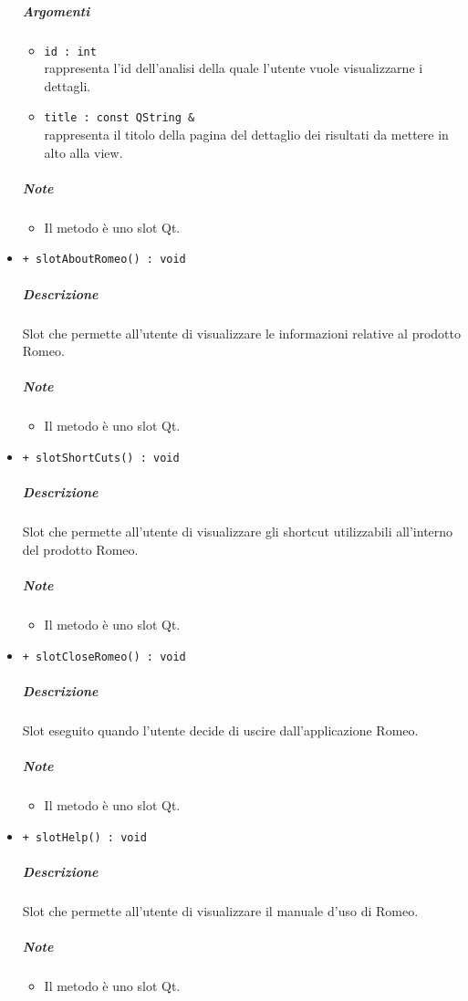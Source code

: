 \begin{itemize}
			\color{black}
			\subparagraph{Argomenti}
			\begin{itemize}
				\item \color{RoyalPurple} \verb!id : int!\\				
\color{black} rappresenta l'id dell'analisi della quale l'utente vuole visualizzarne i dettagli.
				\item \color{RoyalPurple} \verb!title : const QString &!\\				
\color{black} rappresenta il titolo della pagina del dettaglio dei risultati da mettere in alto alla view.
			\end{itemize}
			\subparagraph{Note}
			\begin{itemize}
				\item Il metodo è uno slot\g{} Qt\g{}.
			\end{itemize}
			\item \color{blue} \verb!+ slotAboutRomeo() : void!
			\color{black}
			\subparagraph{Descrizione} Slot\g{} che permette all'utente di visualizzare le informazioni relative al prodotto Romeo.
			\subparagraph{Note}
			\begin{itemize}
				\item Il metodo è uno slot\g{} Qt\g{}.
			\end{itemize}
			\item \color{blue} \verb!+ slotShortCuts() : void!
			\color{black}
			\subparagraph{Descrizione} Slot\g{} che permette all'utente di visualizzare gli shortcut utilizzabili all'interno del prodotto Romeo.
			\subparagraph{Note}
			\begin{itemize}
				\item Il metodo è uno slot\g{} Qt\g{}.
			\end{itemize}
			\item \color{blue} \verb!+ slotCloseRomeo() : void!
			\color{black}
			\subparagraph{Descrizione} Slot\g{} eseguito quando l'utente decide di uscire dall'applicazione Romeo.
			\subparagraph{Note}
			\begin{itemize}
				\item Il metodo è uno slot\g{} Qt\g{}.
			\end{itemize}
			\item \color{blue} \verb!+ slotHelp() : void!
			\color{black}
			\subparagraph{Descrizione} Slot\g{} che permette all'utente di visualizzare il manuale d'uso di Romeo.
			\subparagraph{Note}
			\begin{itemize}
				\item Il metodo è uno slot\g{} Qt\g{}.

\end{itemize}
\end{itemize}
